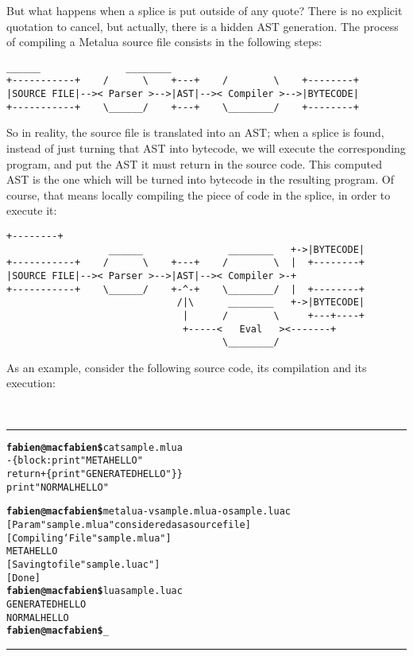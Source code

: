 But what happens when a splice is put outside of any quote? There is
no explicit quotation to cancel, but actually, there is a hidden AST
generation. The process of compiling a Metalua source file consists in
the following steps:

\begin{Verbatim}[fontsize=\scriptsize]
                  ______               ________
+-----------+    /      \    +---+    /        \    +--------+
|SOURCE FILE|-->< Parser >-->|AST|-->< Compiler >-->|BYTECODE|  
+-----------+    \______/    +---+    \________/    +--------+

\end{Verbatim}

So in reality, the source file is translated into an AST; when a
splice is found, instead of just turning that AST into bytecode, we
will execute the corresponding program, and put the AST it must return
in the source code. This computed AST is the one which will be turned
into bytecode in the resulting program. Of course, that means locally
compiling the piece of code in the splice, in order to execute it:

\begin{Verbatim}[fontsize=\scriptsize]
                                                     +--------+
                  ______               ________   +->|BYTECODE|  
+-----------+    /      \    +---+    /        \  |  +--------+
|SOURCE FILE|-->< Parser >-->|AST|-->< Compiler >-+
+-----------+    \______/    +-^-+    \________/  |  +--------+
                              /|\      ________   +->|BYTECODE|  
                               |      /        \     +---+----+
                               +-----<   Eval   ><-------+
                                      \________/
\end{Verbatim}

As an example, consider the following source code, its compilation and
its execution:

\def\braces#1{\{#1\}}
~\\\hrule
\begin{alltt}
{\bf{}fabien@macfabien\$} cat sample.mlua
-\braces{block: print "META HELLO"
         return +\braces{ print "GENERATED HELLO" } }
print "NORMAL HELLO"

{\bf{}fabien@macfabien\$} metalua -v sample.mlua -o sample.luac
[ Param "sample.mlua" considered as a source file ]
[ Compiling `File "sample.mlua" ]
META HELLO
[ Saving to file "sample.luac" ]
[ Done ]
{\bf{}fabien@macfabien\$} lua sample.luac
GENERATED HELLO
NORMAL HELLO
{\bf{}fabien@macfabien\$} _
\end{alltt}
\hrule~\\

